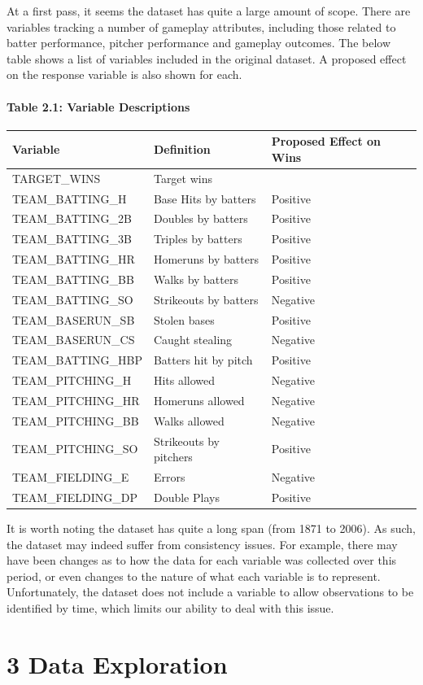 \documentclass[]{article}
\let\oldparagraph\paragraph
\renewcommand{\paragraph}[1]{\oldparagraph{#1}\mbox{}}
\begin{document}
At a first pass, it seems the dataset has quite a large amount of scope.
There are variables tracking a number of gameplay attributes, including
those related to batter performance, pitcher performance and gameplay
outcomes. The below table shows a list of variables included in the
original dataset. A proposed effect on the response variable is also
shown for each.

\paragraph{Table 2.1: Variable
Descriptions}\label{table-2.1-variable-descriptions}

\begin{longtable}[]{@{}lll@{}}
\toprule
Variable & Definition & Proposed Effect on Wins\tabularnewline
\midrule
\endhead
TARGET\_WINS & Target wins &\tabularnewline
TEAM\_BATTING\_H & Base Hits by batters & Positive\tabularnewline
TEAM\_BATTING\_2B & Doubles by batters & Positive\tabularnewline
TEAM\_BATTING\_3B & Triples by batters & Positive\tabularnewline
TEAM\_BATTING\_HR & Homeruns by batters & Positive\tabularnewline
TEAM\_BATTING\_BB & Walks by batters & Positive\tabularnewline
TEAM\_BATTING\_SO & Strikeouts by batters & Negative\tabularnewline
TEAM\_BASERUN\_SB & Stolen bases & Positive\tabularnewline
TEAM\_BASERUN\_CS & Caught stealing & Negative\tabularnewline
TEAM\_BATTING\_HBP & Batters hit by pitch & Positive\tabularnewline
TEAM\_PITCHING\_H & Hits allowed & Negative\tabularnewline
TEAM\_PITCHING\_HR & Homeruns allowed & Negative\tabularnewline
TEAM\_PITCHING\_BB & Walks allowed & Negative\tabularnewline
TEAM\_PITCHING\_SO & Strikeouts by pitchers & Positive\tabularnewline
TEAM\_FIELDING\_E & Errors & Negative\tabularnewline
TEAM\_FIELDING\_DP & Double Plays & Positive\tabularnewline
\bottomrule
\end{longtable}

It is worth noting the dataset has quite a long span (from 1871 to
2006). As such, the dataset may indeed suffer from consistency issues.
For example, there may have been changes as to how the data for each
variable was collected over this period, or even changes to the nature
of what each variable is to represent. Unfortunately, the dataset does
not include a variable to allow observations to be identified by time,
which limits our ability to deal with this issue.

\section{3 Data Exploration}\label{data-exploration}
\end{document}
